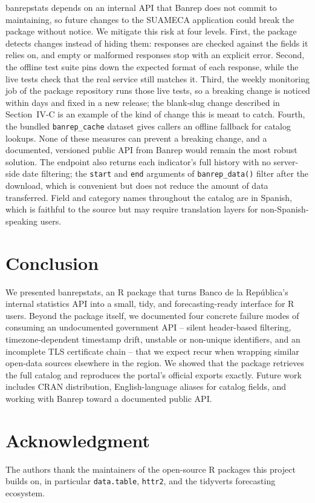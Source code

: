 \documentclass[conference]{IEEEtran}
\begin{document}
banrepstats depends on an internal API that Banrep does not commit to
maintaining, so future changes to the SUAMECA application could break the
package without notice. We mitigate this risk at four levels. First, the
package detects changes instead of hiding them: responses are checked
against the fields it relies on, and empty or malformed responses stop
with an explicit error. Second, the offline test suite pins down the
expected format of each response, while the live tests check that the
real service still matches it. Third, the weekly monitoring job of the
package repository runs those live tests, so a breaking change is noticed within
days and fixed in a new release; the blank-slug change described in
Section~IV-C is an example of the kind of change this is meant to catch.
Fourth, the bundled \texttt{banrep\_cache} dataset gives callers an
offline fallback for catalog lookups. None of these measures can prevent
a breaking change, and a documented, versioned public API from Banrep
would remain the most robust solution.
The endpoint also returns each indicator's full history with no
server-side date filtering; the \texttt{start} and \texttt{end}
arguments of \texttt{banrep\_data()} filter after the download, which is
convenient but does not reduce the amount of data transferred. Field and
category names throughout the catalog are in Spanish, which is faithful
to the source but may require translation layers for
non-Spanish-speaking users.

\section{Conclusion}

We presented banrepstats, an R package that turns Banco de la
Rep\'ublica's internal statistics API into a small, tidy, and
forecasting-ready interface for R users. Beyond the package itself, we
documented four concrete failure modes of consuming an undocumented
government API -- silent header-based filtering, timezone-dependent
timestamp drift, unstable or non-unique identifiers, and an incomplete
TLS certificate chain -- that we expect recur when wrapping similar
open-data sources elsewhere in the region. We showed that the package
retrieves the full catalog and reproduces the portal's official exports
exactly. Future work includes CRAN distribution, English-language aliases
for catalog fields, and working with Banrep toward a documented public
API.

\section*{Acknowledgment}
The authors thank the maintainers of the open-source R packages this
project builds on, in particular \texttt{data.table}, \texttt{httr2}, and
the tidyverts forecasting ecosystem.
\end{document}
